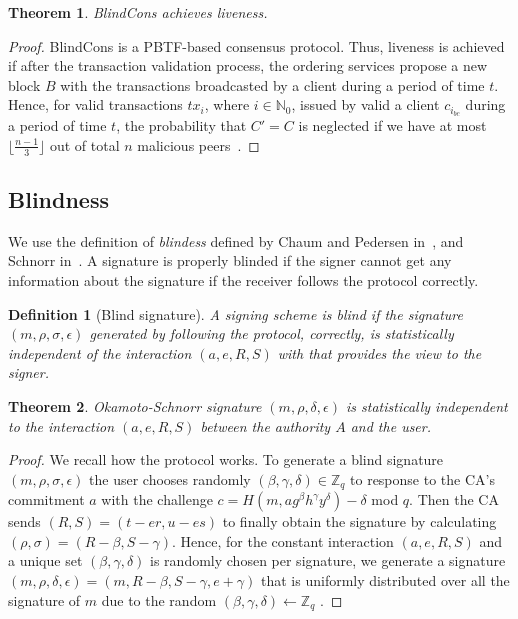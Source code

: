 \documentclass[conference]{IEEEtran}
\newcommand{\name}{BlindCons}
\newtheorem{definition}{Definition}
\newtheorem{theorem}{Theorem}
\newtheorem{proof}{Proof}
\begin{document}
\begin{theorem}
\name{} achieves liveness.
\end{theorem}

\begin{proof}
\name{} is a PBTF-based consensus protocol. Thus, liveness is achieved if after the transaction validation process, the ordering services propose a new block $B$ with the transactions broadcasted by a client during a period of time $t$. Hence, for valid transactions $tx_i$, where $i\in \mathbb{N}_0$, issued by valid a client $c_{i_{bc}}$ during a period of time $t$, the probability that $C'= C$ is neglected if we have at most $\lfloor\frac{n-1}{3}\rfloor$ out of total $n$ malicious peers~\cite{castro1999practical}.
\end{proof}

\subsection{Blindness}

We use the definition of \emph{blindess} defined by Chaum and Pedersen in~\cite{10.1007/3-540-48071-4_7}, and Schnorr in~\cite{schnorr2001security}. A signature is properly blinded if the signer cannot get any information about the signature if the receiver follows the protocol correctly.

\begin{definition}[Blind signature]
A signing scheme is \emph{blind} if the signature $(m,\rho,\sigma,\epsilon)$ generated by following the protocol, correctly, is statistically independent of the interaction $(a,e,R,S)$ with that provides the view to the signer.
\end{definition}

\begin{theorem}
Okamoto-Schnorr signature $(m,\rho,\delta,\epsilon)$ is statistically independent to the interaction $(a,e,R,S)$ between the authority $A$ and the user.
\end{theorem}

\begin{proof}
We recall how the protocol works. To generate a blind signature $(m,\rho,\sigma,\epsilon)$ the user chooses randomly $(\beta,\gamma,\delta)\in \mathbb{Z}_q$ to response to the CA's commitment $a$ with the challenge $c=H(m,ag^\beta h^\gamma y^\delta) -\delta$ mod $q$. Then the CA sends $(R,S)=(t-er,u-es)$ to finally obtain the signature by calculating $(\rho,\sigma)=(R-\beta,S-\gamma)$.
Hence, for the constant interaction $(a,e,R,S)$ and a unique set $(\beta,\gamma,\delta)$ is randomly chosen per signature, we generate a signature $(m,\rho,\delta,\epsilon)=(m,R-\beta,S-\gamma,e+\gamma)$ that is uniformly distributed over all the signature of $m$ due to the random $(\beta,\gamma,\delta) \gets \mathbb{Z}_q$ \cite{schnorr2001security}.
\end{proof}
\end{document}
